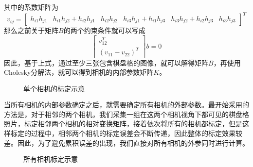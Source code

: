 其中的系数矩阵为
\begin{equation}
    v_{ij}=\left[ \begin{array}{cccccc} h_{i1}h_{j1} & h_{i1}h_{j2}+h_{i2}h_{j1} & h_{i2}h_{j2} & h_{i3}h_{j1}+h_{i1}h_{j3} & h_{i3}h_{j2}+h_{i2}h_{j3} & h_{i3}h_{j3} \end{array} \right]^T
\end{equation}
那么之前关于矩阵\(B\)的两个约束条件就可以写成
\begin{equation}
    \left[ \begin{array}{c} v^T_{12} \\ (v_{11}-v_{22})^T \end{array} \right]b=0
\end{equation}
因此，基于上式，通过至少三张包含棋盘格的图像，就可以解得矩阵\(B\)，再使用Cholesky分解法，就可以得到相机的内部参数矩阵\(K\)。
\begin{figure}[htbp]
    \centering
    \caption{单个相机的标定示意\label{fig:calsingle}}
\end{figure}

当所有相机的内部参数确定之后，就需要确定所有相机的外部参数。最开始采用的方法是，对于相邻的两个相机，我们采集一组在这两个相机视角下都可见的棋盘格照片，标定相邻两个相机的相对变换矩阵，接着依次将所有的相机都标定，但是这样标定的过程中，相邻两个相机的标定误差会不断传递，因此整体的标定效果较差。因此，为了避免累积误差的出现，我们直接对所有相机的外参同时进行计算。
\begin{figure}[htbp]
    \centering
    \caption{所有相机标定示意\label{fig:calall}}
\end{figure}


